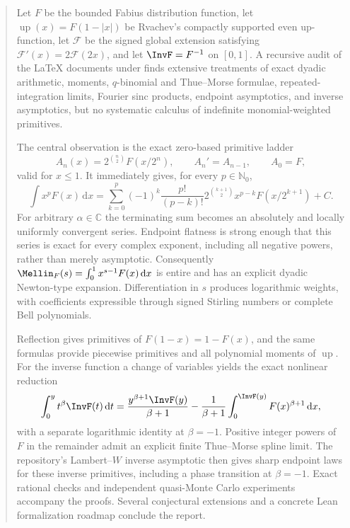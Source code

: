 \documentclass[11pt,oneside]{article}
\theoremstyle{definition}
\theoremstyle{remark}
\newcommand{\Up}{\operatorname{up}}
\newcommand{\C}{\mathbb C}
\newcommand{\N}{\mathbb N}
\newcommand{\dd}{\,\mathrm d}
\newcommand{\1}{\mathbf 1}
\begin{document}
\begin{abstract}
Let $F$ be the bounded Fabius distribution function, let $\Up(x)=F(1-|x|)$ be
Rvachev's compactly supported even up-function, let $\mathcal F$ be the signed
global extension satisfying $\mathcal F'(x)=2\mathcal F(2x)$, and let
$\InvF=F^{-1}$ on $[0,1]$.  A recursive audit of the LaTeX documents under
\repo{} finds extensive treatments of exact dyadic arithmetic, moments,
$q$-binomial and Thue--Morse formulae, repeated-integration limits, Fourier sinc
products, endpoint asymptotics, and inverse asymptotics, but no systematic
calculus of indefinite monomial-weighted primitives.

The central observation is the exact zero-based primitive ladder
\[
 A_n(x)=2^{\binom n2}F(x/2^n),\qquad A_n'=A_{n-1},\qquad A_0=F,
\]
valid for $x\le1$.  It immediately gives, for every $p\in\N_0$,
\[
 \int x^pF(x)\dd x=
 \sum_{k=0}^{p}(-1)^k\frac{p!}{(p-k)!}
 2^{\binom{k+1}{2}}x^{p-k}F(x/2^{k+1})+C.
\]
For arbitrary $\alpha\in\C$ the terminating sum becomes an absolutely and
locally uniformly convergent series.  Endpoint flatness is strong enough that
this series is exact for every complex exponent, including all negative
powers, rather than merely asymptotic.  Consequently
$\Mellin_F(s)=\int_0^1x^{s-1}F(x)\dd x$ is entire and has an explicit dyadic
Newton-type expansion.  Differentiation in $s$ produces logarithmic weights,
with coefficients expressible through signed Stirling numbers or complete Bell
polynomials.

Reflection gives primitives of $F(1-x)=1-F(x)$, and the same formulas provide
piecewise primitives and all polynomial moments of $\Up$.  For the inverse
function a change of variables yields the exact nonlinear reduction
\[
 \int_0^y t^\beta\InvF(t)\dd t=
 \frac{y^{\beta+1}\InvF(y)}{\beta+1}
 -\frac1{\beta+1}\int_0^{\InvF(y)}F(x)^{\beta+1}\dd x,
\]
with a separate logarithmic identity at $\beta=-1$.  Positive integer powers of
$F$ in the remainder admit an explicit finite Thue--Morse spline limit.
The repository's Lambert--$W$ inverse asymptotic then gives sharp endpoint laws
for these inverse primitives, including a phase transition at $\beta=-1$.
Exact rational checks and independent quasi-Monte Carlo experiments accompany
the proofs.  Several conjectural extensions and a concrete Lean formalization
roadmap conclude the report.
\end{abstract}
\end{document}
